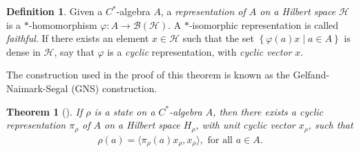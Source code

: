 \documentclass[11pt,a4paper]{report}
\theoremstyle{plain}
\newtheorem{thm}{Theorem}
\theoremstyle{definition}
\newtheorem{defn}{Definition}
\newcommand{\1}{\mathbbm{1}}
\renewcommand{\H}{\mathcal{H}}
\newcommand{\B}{\mathcal{B}}
\newcommand{\BH}{\mathcal{\B(\H)}}
\renewcommand{\phi}{\varphi}
\begin{document}
\begin{defn}
	Given a $C^\ast$-algebra $A$, a \emph{representation of $A$ on a Hilbert space 
	$\H$} is a $\ast$-homomorphism $\phi: A \to \BH$. A $\ast$-isomorphic 
	representation is called \emph{faithful}. If there exists an element $x\in\H$ 
	such that the set $\left\{\phi(a)x \mid a\in A\right\}$ is dense in $\H$, say 
	that $\phi$ is a \emph{cyclic} representation, with \emph{cyclic vector} $x$.

\end{defn}	
The construction used in the proof of this theorem is known as the 
Gelfand-Naimark-Segal (GNS) construction.
\begin{thm}[{\cite[4.5.2]{kadison83}}]\label{thm:gns}
	If $\rho$ is a state on a $C^\ast$-algebra $A$, then there exists a cyclic 
	representation $\pi_\rho$ of $A$ on a Hilbert space ${H}_\rho$, with unit cyclic 
	vector $x_\rho$, such that 
	\begin{align*} 
		\rho(a)= \langle \pi_\rho (a) x_\rho, x_\rho \rangle,  \mbox{ for all } a \in A.
	\end{align*}
\end{thm}
\end{document}
